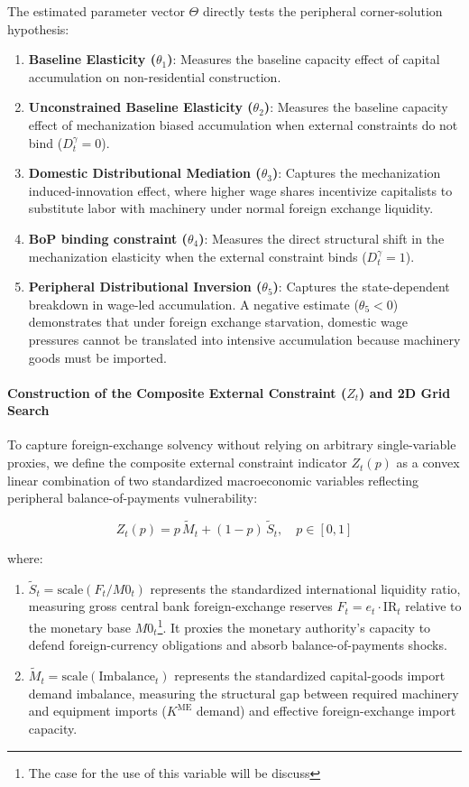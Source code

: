 The estimated parameter vector $\Theta$ directly tests the peripheral corner-solution hypothesis:
\begin{enumerate}
	\item \textbf{Baseline Elasticity ($\theta_1$)}: Measures the baseline capacity effect of capital accumulation on non-residential construction.
	\item \textbf{Unconstrained Baseline Elasticity ($\theta_2$)}: Measures the baseline capacity effect of mechanization biased accumulation when external constraints do not bind ($D_t^{\gamma} = 0$).
	\item \textbf{Domestic Distributional Mediation ($\theta_3$)}: Captures the mechanization induced-innovation effect, where higher wage shares incentivize capitalists to substitute labor with machinery under normal foreign exchange liquidity.
	\item \textbf{BoP binding constraint ($\theta_4$)}: Measures the direct structural shift in the mechanization elasticity when the external constraint binds ($D_t^{\gamma} = 1$).
	\item \textbf{Peripheral Distributional Inversion ($\theta_5$)}: Captures the state-dependent breakdown in wage-led accumulation. A negative estimate ($\theta_5 < 0$) demonstrates that under foreign exchange starvation, domestic wage pressures cannot be translated into intensive accumulation because machinery goods must be imported.
\end{enumerate}

\paragraph{Construction of the Composite External Constraint ($Z_t$) and 2D Grid Search}
To capture foreign-exchange solvency without relying on arbitrary single-variable proxies, we define the composite external constraint indicator $Z_t(p)$ as a convex linear combination of two standardized macroeconomic variables reflecting peripheral balance-of-payments vulnerability:

\begin{equation}
	Z_t(p) = p \, \tilde{M}_t + (1 - p) \, \tilde{S}_t, \quad p \in [0, 1]
\end{equation}

where:
\begin{enumerate}
	\item $\tilde{S}_t = \text{scale}(F_t / M0_t)$ represents the standardized international liquidity ratio, measuring gross central bank foreign-exchange reserves $F_t = e_t \cdot \text{IR}_t$ relative to the monetary base $M0_t$\footnote{The case for the use of this variable will be discuss}. It proxies the monetary authority's capacity to defend foreign-currency obligations and absorb balance-of-payments shocks.
	\item $\tilde{M}_t = \text{scale}(\text{Imbalance}_t)$ represents the standardized capital-goods import demand imbalance, measuring the structural gap between required machinery and equipment imports ($K^{\text{ME}}$ demand) and effective foreign-exchange import capacity.
\end{enumerate}

